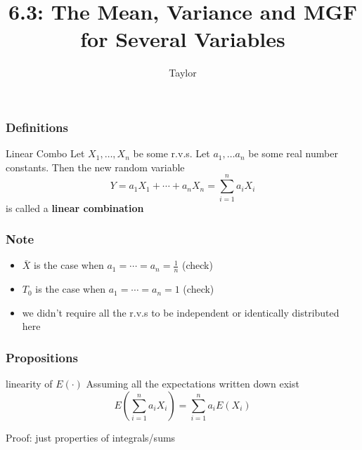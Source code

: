 \documentclass{beamer}
\title["6.3"]{6.3: The Mean, Variance and MGF for Several Variables}
\author{Taylor}
\institute[UVA] 
{
University of Virginia \\ 
\medskip
\textit{} 
}
\date{}
\begin{document}

\begin{frame}
\titlepage 
\end{frame}

\begin{frame}
\frametitle{Definitions}

\begin{block}{Linear Combo}
Let $X_1, \ldots, X_n$ be some r.v.s. Let $a_1, \ldots a_n$ be some real number constants. Then the new random variable
\[
Y = a_1 X_1 + \cdots + a_n X_n = \sum_{i=1}^n a_i X_i
\]
is called a {\bf linear combination}
\end{block}

\end{frame}

\begin{frame}
\frametitle{Note}

\begin{itemize}
\item $\bar{X}$ is the case when $a_1 = \cdots = a_n = \frac{1}{n}$ (check)
\item $T_0$ is the case when $a_1 = \cdots = a_n = 1$ (check)
\item we didn't require all the r.v.s to be independent or identically distributed here 
\end{itemize}


\end{frame}


\begin{frame}
\frametitle{Propositions}

\begin{block}{linearity of $E(\cdot)$}
Assuming all the expectations written down exist
\[
E \left(\sum_{i=1}^n a_i X_i \right) = \sum_{i=1}^n a_i E(X_i)
\]
\end{block}

Proof: just properties of integrals/sums
\end{frame}
\end{document}
